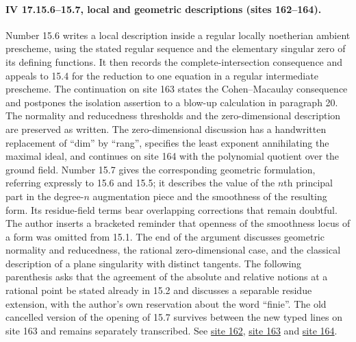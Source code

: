 \paragraph{IV 17.15.6--15.7, local and geometric descriptions (sites 162--164).}
Number 15.6 writes a local description inside a regular locally noetherian ambient prescheme, using the stated regular sequence and the elementary singular zero of its defining functions. It then records the complete-intersection consequence and appeals to 15.4 for the reduction to one equation in a regular intermediate prescheme. The continuation on site 163 states the Cohen--Macaulay consequence and postpones the isolation assertion to a blow-up calculation in paragraph 20. The normality and reducedness thresholds and the zero-dimensional description are preserved as written. The zero-dimensional discussion has a handwritten replacement of ``dim'' by ``rang'', specifies the least exponent annihilating the maximal ideal, and continues on site 164 with the polynomial quotient over the ground field. Number 15.7 gives the corresponding geometric formulation, referring expressly to 15.6 and 15.5; it describes the value of the $n$th principal part in the degree-$n$ augmentation piece and the smoothness of the resulting form. Its residue-field terms bear overlapping corrections that remain doubtful. The author inserts a bracketed reminder that openness of the smoothness locus of a form was omitted from 15.1. The end of the argument discusses geometric normality and reducedness, the rational zero-dimensional case, and the classical description of a plane singularity with distinct tangents. The following parenthesis asks that the agreement of the absolute and relative notions at a rational point be stated already in 15.2 and discusses a separable residue extension, with the author's own reservation about the word ``finie''. The old cancelled version of the opening of 15.7 survives between the new typed lines on site 163 and remains separately transcribed. See \href{https://grothendieck.umontpellier.fr/web/viewer.html?file=../25.pdf#page=163}{site 162}, \href{https://grothendieck.umontpellier.fr/web/viewer.html?file=../25.pdf#page=164}{site 163} and \href{https://grothendieck.umontpellier.fr/web/viewer.html?file=../25.pdf#page=165}{site 164}.

